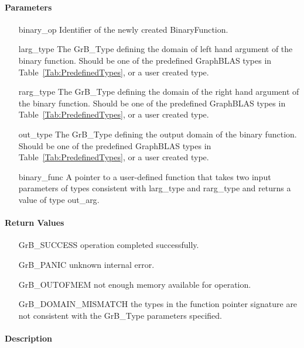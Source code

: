 \paragraph{Parameters}

\begin{itemize}[leftmargin=1.1in]
    \item[{\sf binary\_op}]      Identifier of the newly created BinaryFunction.
    \item[{\sf larg\_type}]      The {\sf GrB\_Type} defining the domain of left hand argument of
    the binary function. Should be one of the predefined
    GraphBLAS types in Table~\ref{Tab:PredefinedTypes}, or a user created type.
    \item[{\sf rarg\_type}]      The {\sf GrB\_Type} defining the domain of the right hand 
    argument of the binary function. Should be one of the predefined
    GraphBLAS types in Table~\ref{Tab:PredefinedTypes}, or a user created type.
    \item[{\sf out\_type}]       The {\sf GrB\_Type} defining the output domain of the binary
    function. Should be one of the predefined
    GraphBLAS types in Table~\ref{Tab:PredefinedTypes}, or a user created type.
    \item[{\sf binary\_func}]    A pointer to a user-defined function that takes two input 
    parameters of types consistent with {\sf larg\_type} and {\sf rarg\_type} and returns a 
    value of type {\sf out\_arg}.
\end{itemize}


\paragraph{Return Values}

\begin{itemize}[leftmargin=2.1in]
\item[{\sf GrB\_SUCCESS}]           operation completed successfully.
\item[{\sf GrB\_PANIC}]             unknown internal error.
\item[{\sf GrB\_OUTOFMEM}]          not enough memory available for operation.
\item[{\sf GrB\_DOMAIN\_MISMATCH}]  the types in the function pointer signature are not   
                                    consistent with the {\sf GrB\_Type} parameters specified.
\end{itemize}

\paragraph{Description}


